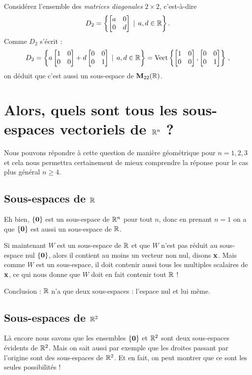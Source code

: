 \begin{myexample} Considérez l'ensemble des  \emph{matrices diagonales} $2\times 2$, c'est-à-dire
$$
D_2 = \left\{ \left[ \begin{matrix} a & 0 \\ 0 & d \end{matrix} \right] \, \mid \, a,d\in\mathbb{R} \right\}.
$$
Comme $D_2$ s'écrit :
$$
D_2 = \left\{ a\left[ \begin{matrix} 1 & 0 \\ 0 & 0 \end{matrix} \right] +d\left[ \begin{matrix} 0 & 0 \\ 0 & 1 \end{matrix} \right]  \, \mid \, a,d\in\mathbb{R} \right\} = \textrm{Vect}\left\{\left[ \begin{matrix} 1 & 0 \\ 0 & 0 \end{matrix} \right],\left[ \begin{matrix} 0 & 0 \\ 0 & 1 \end{matrix} \right] \right\}\,,
$$
on déduit que c'est aussi un sous-espace de $\mathbf{M}_{22}(\mathbb{R})$.
\end{myexample}




\section{Alors, quels sont tous les sous-espaces vectoriels de $\mathbb{R}^n$ ?}

Nous pouvons répondre à cette question de manière géométrique pour $n=1,2,3$ et cela nous permettra certainement de mieux comprendre la réponse pour le cas plus général $n\geq 4$.

\subsection{Sous-espaces de $\mathbb{R}$}

Eh bien, $\{ \mathbf{0}\}$ est un sous-espace de $\mathbb{R}^n$ pour tout $n$, donc en prenant $n=1$ on a que
$\{\mathbf{0}\}$ est aussi un sous-espace de $\mathbb{R}$.

Si maintenant $W$ est un sous-espace de $\mathbb{R}$ et que $W$ n'est pas réduit au sous-espace nul $\{\mathbf{0}\}$, alors
il contient au moins un vecteur non nul, disons $\mathbf{x}$.  Mais comme $W$ est
un sous-espace, il doit contenir aussi tous les multiples scalaires de $\mathbf{x}$, ce qui nous donne que $W$ doit en fait contenir tout $\mathbb{R}$ !

Conclusion : $\mathbb{R}$ n'a que deux sous-espaces : l'espace nul et lui m\^eme.


\subsection{Sous-espaces de $\mathbb{R}^2$}

Là encore nous savons que les ensembles $\{ \mathbf{0}\}$ et $\mathbb{R}^2$ sont deux sous-espaces évidents de $\mathbb{R}^2$.
Mais on sait aussi par exemple que les droites passant par l'origine sont des sous-espaces de $\mathbb{R}^2$. Et en fait, on peut montrer que ce sont les seules possibilités !


